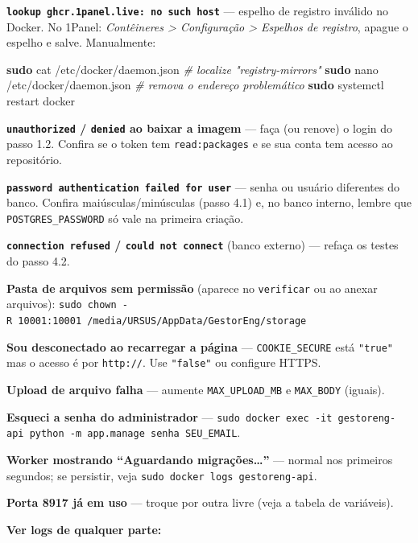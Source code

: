 \documentclass[
  10pt,
]{article}
\newenvironment{Shaded}{\begin{snugshade}}{\end{snugshade}}
\newcommand{\CommentTok}[1]{\textcolor[rgb]{0.56,0.35,0.01}{\textit{#1}}}
\newcommand{\FunctionTok}[1]{\textcolor[rgb]{0.13,0.29,0.53}{\textbf{#1}}}
\newcommand{\NormalTok}[1]{#1}
\begin{document}
\textbf{\texttt{lookup\ ghcr.1panel.live:\ no\ such\ host}} --- espelho
de registro inválido no Docker. No 1Panel: \emph{Contêineres
\textgreater{} Configuração \textgreater{} Espelhos de registro}, apague
o espelho e salve. Manualmente:

\begin{Shaded}
\begin{Highlighting}[]
\FunctionTok{sudo}\NormalTok{ cat /etc/docker/daemon.json          }\CommentTok{\# localize "registry{-}mirrors"}
\FunctionTok{sudo}\NormalTok{ nano /etc/docker/daemon.json         }\CommentTok{\# remova o endereço problemático}
\FunctionTok{sudo}\NormalTok{ systemctl restart docker}
\end{Highlighting}
\end{Shaded}

\textbf{\texttt{unauthorized} / \texttt{denied} ao baixar a imagem} ---
faça (ou renove) o login do passo 1.2. Confira se o token tem
\texttt{read:packages} e se sua conta tem acesso ao repositório.

\textbf{\texttt{password\ authentication\ failed\ for\ user}} --- senha
ou usuário diferentes do banco. Confira maiúsculas/minúsculas (passo
4.1) e, no banco interno, lembre que \texttt{POSTGRES\_PASSWORD} só vale
na primeira criação.

\textbf{\texttt{connection\ refused} / \texttt{could\ not\ connect}}
(banco externo) --- refaça os testes do passo 4.2.

\textbf{Pasta de arquivos sem permissão} (aparece no \texttt{verificar}
ou ao anexar arquivos):
\texttt{sudo\ chown\ -R\ 10001:10001\ /media/URSUS/AppData/GestorEng/storage}

\textbf{Sou desconectado ao recarregar a página} ---
\texttt{COOKIE\_SECURE} está \texttt{"true"} mas o acesso é por
\texttt{http://}. Use \texttt{"false"} ou configure HTTPS.

\textbf{Upload de arquivo falha} --- aumente \texttt{MAX\_UPLOAD\_MB} e
\texttt{MAX\_BODY} (iguais).

\textbf{Esqueci a senha do administrador} ---
\texttt{sudo\ docker\ exec\ -it\ gestoreng-api\ python\ -m\ app.manage\ senha\ SEU\_EMAIL}.

\textbf{Worker mostrando ``Aguardando migrações\ldots{}''} --- normal
nos primeiros segundos; se persistir, veja
\texttt{sudo\ docker\ logs\ gestoreng-api}.

\textbf{Porta 8917 já em uso} --- troque por outra livre (veja a tabela
de variáveis).

\textbf{Ver logs de qualquer parte:}
\end{document}
